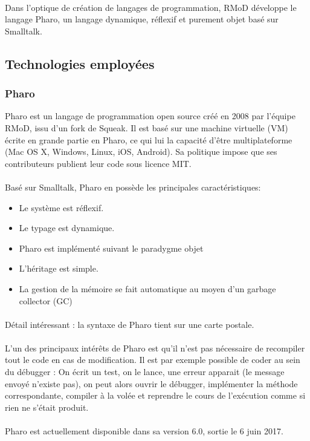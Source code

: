 	\paragraph{}
	Dans l'optique de création de langages de programmation, RMoD développe le langage Pharo, un langage dynamique, réflexif et purement objet basé sur Smalltalk.

	\subsection{Technologies employées}
	\subsubsection{Pharo}
	Pharo est un langage de programmation open source créé en 2008 par l'équipe RMoD, issu d'un fork de Squeak. Il est basé sur une machine virtuelle (VM) écrite en grande partie en Pharo, ce qui lui la capacité d'être multiplateforme (Mac OS X, Windows, Linux, iOS, Android). Sa politique impose que ses contributeurs publient leur code sous licence MIT.

	\paragraph{}
	Basé sur Smalltalk, Pharo en possède les principales caractéristiques:
	\begin{itemize}
		\item Le système est réflexif.
		\item Le typage est dynamique.
		\item Pharo est implémenté suivant le paradygme objet
		\item L'héritage est simple.
		\item La gestion de la mémoire se fait automatique au moyen d'un garbage collector (GC)
	\end{itemize}

	\paragraph{}
	Détail intéressant : la syntaxe de Pharo tient sur une carte postale.

	\paragraph{}
	L'un des principaux intérêts de Pharo est qu'il n'est pas nécessaire de recompiler tout le code en cas de modification. Il est par exemple possible de coder au sein du débugger : On écrit un test, on le lance, une erreur apparait (le message envoyé n'existe pas), on peut alors ouvrir le débugger, implémenter la méthode correspondante, compiler à la volée et reprendre le cours de l'exécution comme si rien ne s'était produit.

	\paragraph{}
	Pharo est actuellement disponible dans sa version 6.0, sortie le 6 juin 2017.